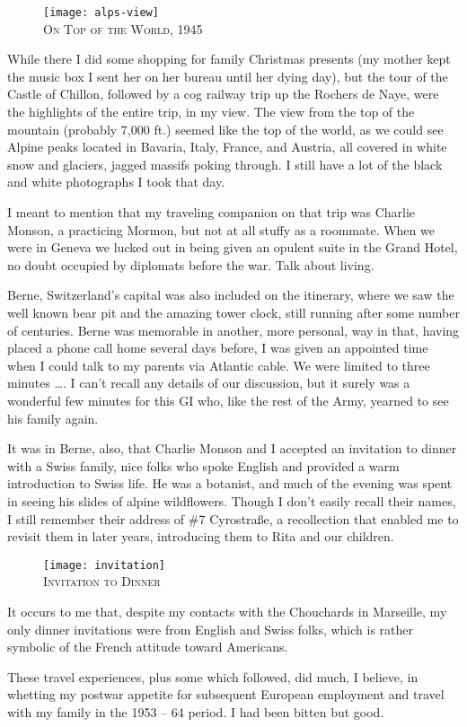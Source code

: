\documentclass[../m3y]{subfiles}
\begin{document}
\begin{figure}[h]
\centering
\texttt{[image: alps-view]}\\
\medskip
{\newtimes\textsc{On Top of the World, 1945}}
\end{figure}

While there I did some shopping for family Christmas presents (my mother kept the music box I sent her on her bureau until her dying day), but the tour of the Castle of Chillon, followed by a cog railway trip up the Rochers de Naye, were the highlights of the entire trip, in my view. The view from the top of the mountain (probably 7,000 ft.) seemed like the top of the world, as we could see Alpine peaks located in Bavaria, Italy, France, and Austria, all covered in white snow and glaciers, jagged massifs poking through. I still have a lot of the black and white photographs I took that day.

I meant to mention that my traveling companion on that trip was Charlie Monson, a practicing Mormon, but not at all stuffy as a roommate. When we were in Geneva we lucked out in being given an opulent suite in the Grand Hotel, no doubt occupied by diplomats before the war. Talk about living.

Berne, Switzerland's capital was also included on the itinerary, where we saw the well known bear pit and the amazing tower clock, still running after some number of centuries. Berne was memorable in another, more personal, way in that, having placed a phone call home several days before, I was given an appointed time when I could talk to my parents via Atlantic cable. We were limited to three minutes \ldots\@. I can't recall any details of our discussion, but it surely was a wonderful few minutes for this GI who, like the rest of the Army, yearned to see his family again.

It was in Berne, also, that Charlie Monson and I accepted an invitation to dinner with a Swiss family, nice folks who spoke English and provided a warm introduction to Swiss life. He was a botanist, and much of the evening was spent in seeing his slides of alpine wildflowers. Though I don't easily recall their names, I still remember their address of \#7 Cyrostra{\ss}e, a recollection that enabled me to revisit them in later years, introducing them to Rita and our children.

\begin{figure}[h]
\centering
\texttt{[image: invitation]}\\
\medskip
{\newtimes\textsc{Invitation to Dinner}}
\end{figure}

It occurs to me that, despite my contacts with the Chouchards in Marseille, my only dinner invitations were from English and Swiss folks, which is rather symbolic of the French attitude toward Americans.

These travel experiences, plus some which followed, did much, I believe, in whetting my postwar appetite for subsequent European employment and travel with my family in the 1953 -- 64 period. I had been bitten but good.
\end{document}
